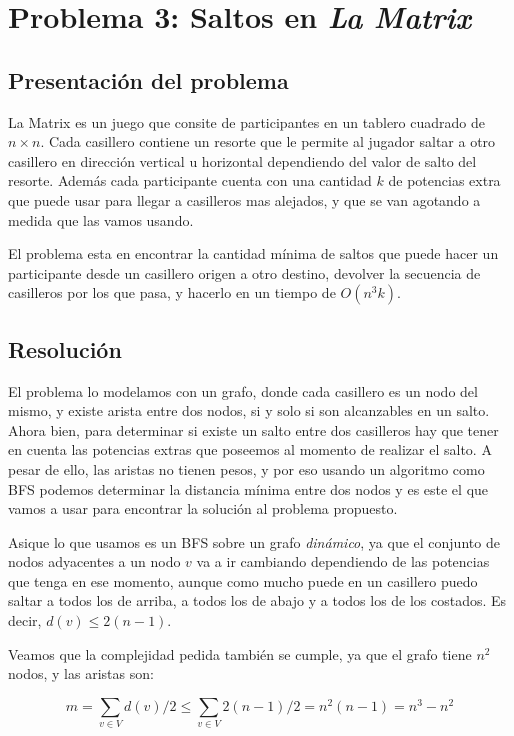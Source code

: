 \section{Problema 3: Saltos en {\it La Matrix}}

\subsection{Presentaci\'on del problema}

La Matrix es un juego que consite de participantes en un tablero cuadrado de $n\times n$. Cada casillero contiene un resorte que le permite al jugador saltar a otro casillero en direcci\'on vertical u horizontal dependiendo del valor de salto del resorte. Adem\'as cada participante cuenta con una cantidad $k$ de potencias extra que puede usar para llegar a casilleros mas alejados, y que se van agotando a medida que las vamos usando.

El problema esta en encontrar la cantidad m\'inima de saltos que puede hacer un participante desde un casillero origen a otro destino, devolver la secuencia de casilleros por los que pasa, y hacerlo en un tiempo de $O(n^3 k)$. 

\subsection{Resoluci\'on}

El problema lo modelamos con un grafo, donde cada casillero es un nodo del mismo, y existe arista entre dos nodos, si y solo si son alcanzables en un salto. Ahora bien, para determinar si existe un salto entre dos casilleros hay que tener en cuenta las potencias extras que poseemos al momento de realizar el salto. A pesar de ello, las aristas no tienen pesos, y por eso usando un algoritmo como BFS podemos determinar la distancia m\'inima entre dos nodos y es este el que vamos a usar para encontrar la soluci\'on al problema propuesto. 

Asique lo que usamos es un BFS sobre un grafo \textit{din\'amico}, ya que el conjunto de nodos adyacentes a un nodo $v$ va a ir cambiando dependiendo de las potencias que tenga en ese momento, aunque como mucho puede en un casillero puedo saltar a todos los de arriba, a todos los de abajo y a todos los de los costados. Es decir, $d(v) \leq 2(n-1)$. 

Veamos que la complejidad pedida tambi\'en se cumple, ya que el grafo tiene $n^2$ nodos, y las aristas son: 

\begin{equation*}
 m = \sum_{v \in V} d(v) / 2 \leq \sum_{v \in V} 2(n-1) / 2 = n^2 (n-1) = n^3 - n^2
\end{equation*}

